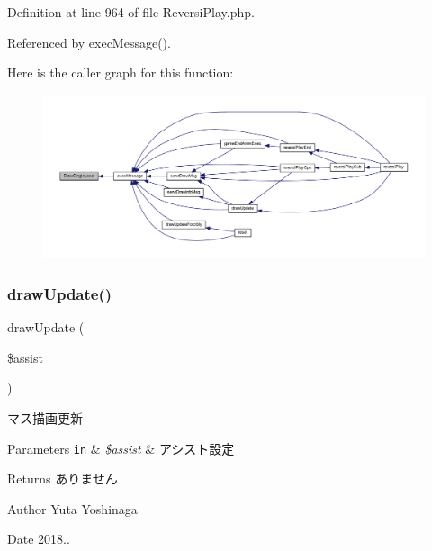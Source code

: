 Definition at line 964 of file Reversi\+Play.\+php.



Referenced by exec\+Message().

Here is the caller graph for this function\+:
\nopagebreak
\begin{figure}[H]
\begin{center}
\leavevmode
\includegraphics[width=350pt]{class_reversi_play_af0649b9d4a899e0802c739928136de99_icgraph}
\end{center}
\end{figure}
\mbox{\label{class_reversi_play_a52029e5f2e049767d1f67c3f5c18ce9f}} 
\subsubsection{\texorpdfstring{draw\+Update()}{drawUpdate()}}
{\footnotesize\ttfamily draw\+Update (\begin{DoxyParamCaption}\item[{}]{\$assist }\end{DoxyParamCaption})}



マス描画更新 


\begin{DoxyParams}[1]{Parameters}
\mbox{\tt in}  & {\em \$assist} & アシスト設定 \\
\hline
\end{DoxyParams}
\begin{DoxyReturn}{Returns}
ありません 
\end{DoxyReturn}
\begin{DoxyAuthor}{Author}
Yuta Yoshinaga 
\end{DoxyAuthor}
\begin{DoxyDate}{Date}
2018.. 
\end{DoxyDate}


